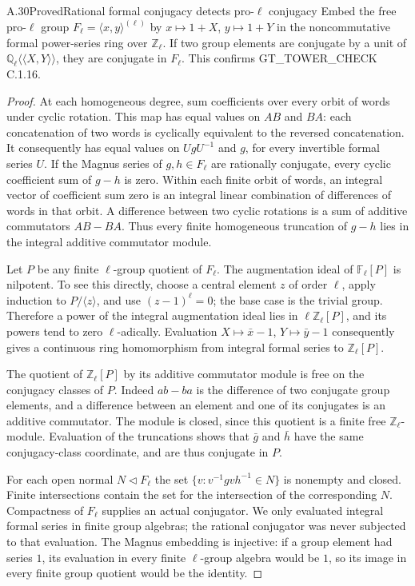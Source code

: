 \begin{result}{A.30}{Proved}{Rational formal conjugacy detects pro-$\ell$ conjugacy}
\label{coh:magnusconj}
Embed the free pro-$\ell$ group $F_\ell=\langle x,y\rangle^{(\ell)}$
by $x\mapsto1+X$, $y\mapsto1+Y$ in the noncommutative formal
power-series ring over $\mathbb Z_\ell$. If two group elements
are conjugate by a unit of
$\mathbb Q_\ell\langle\!\langle X,Y\rangle\!\rangle$, they
are conjugate in $F_\ell$. This confirms GT\_TOWER\_CHECK C.1.16.
\end{result}
\begin{proof}
At each homogeneous degree, sum coefficients over every orbit of words
under cyclic rotation. This map has equal values on $AB$ and $BA$:
each concatenation of two words is cyclically equivalent to the reversed
concatenation. It consequently has equal values on $UgU^{-1}$ and
$g$, for every invertible formal series $U$. If the Magnus series of
$g,h\in F_\ell$ are rationally conjugate, every cyclic coefficient
sum of $g-h$ is zero. Within each finite orbit of words, an integral
vector of coefficient sum zero is an integral linear combination of
differences of words in that orbit. A difference between two cyclic
rotations is a sum of additive commutators $AB-BA$. Thus every finite
homogeneous truncation of $g-h$ lies in the integral additive
commutator module.

Let $P$ be any finite $\ell$-group quotient of $F_\ell$.
The augmentation ideal of $\mathbb F_\ell[P]$ is nilpotent. To see
this directly, choose a central element $z$ of order $\ell$, apply
induction to $P/\langle z\rangle$, and use $(z-1)^\ell=0$;
the base case is the trivial group. Therefore a power of the integral
augmentation ideal lies in $\ell\mathbb Z_\ell[P]$, and its
powers tend to zero $\ell$-adically. Evaluation
$X\mapsto\bar x-1$, $Y\mapsto\bar y-1$ consequently gives a
continuous ring homomorphism from integral formal series to
$\mathbb Z_\ell[P]$.

The quotient of $\mathbb Z_\ell[P]$ by its additive commutator
module is free on the conjugacy classes of $P$. Indeed $ab-ba$ is
the difference of two conjugate group elements, and a difference
between an element and one of its conjugates is an additive
commutator. The module is closed, since this quotient is a finite
free $\mathbb Z_\ell$-module. Evaluation of the truncations shows
that $\bar g$ and $\bar h$ have the same conjugacy-class coordinate,
and are thus conjugate in $P$.

For each open normal $N\triangleleft F_\ell$ the set
$\{v:v^{-1}gvh^{-1}\in N\}$ is nonempty and closed.
Finite intersections contain the set for the intersection of the
corresponding $N$. Compactness of $F_\ell$ supplies an actual
conjugator. We only evaluated integral formal series in finite group
algebras; the rational conjugator was never subjected to that
evaluation. The Magnus embedding is injective: if a group element
had series $1$, its evaluation in every finite $\ell$-group algebra
would be $1$, so its image in every finite group quotient would be
the identity.
\end{proof}

